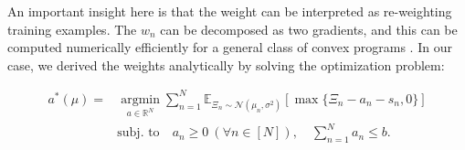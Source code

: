 \documentclass[12pt]{article}
\begin{document}
An important insight here is that the weight can be interpreted as re-weighting training examples. The $w_n$ can be decomposed as two gradients, and this can be computed numerically efficiently for a general class of convex programs \cite{agrawal2019differentiable}. In our case, we derived the weights analytically by solving the optimization problem:

\begin{align*}
a^*(\mu)
=&\operatorname*{\arg\min}_{a\in\mathbb{R}^N}
\sum_{n=1}^N
\mathbb{E}_{\Xi_n\sim\mathcal{N}(\mu_n,\sigma^2)}
\left[\max\{\Xi_n-a_n-s_n,0\}\right] \\
&\text{subj. to}\quad
a_n\ge0~(\forall n\in[N]),
\quad
\sum_{n=1}^Na_n\le b.
\end{align*}
\end{document}
